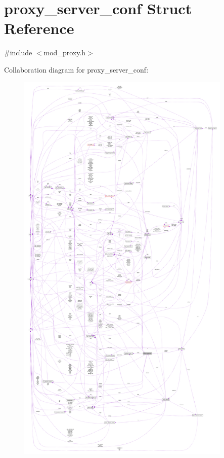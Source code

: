 \hypertarget{structproxy__server__conf}{}\section{proxy\+\_\+server\+\_\+conf Struct Reference}
\label{structproxy__server__conf}


{\ttfamily \#include $<$mod\+\_\+proxy.\+h$>$}



Collaboration diagram for proxy\+\_\+server\+\_\+conf\+:
\nopagebreak
\begin{figure}[H]
\begin{center}
\leavevmode
\includegraphics[height=550pt]{structproxy__server__conf__coll__graph}
\end{center}
\end{figure}
